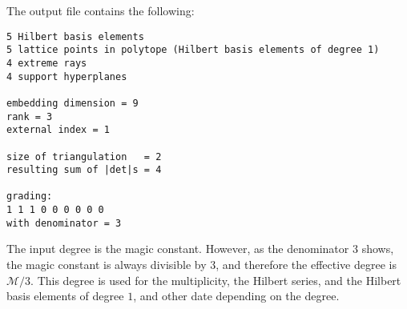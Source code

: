 \documentclass[12pt,a4paper]{scrartcl}
\theoremstyle{definition}
\begin{document}
The output file contains the following:

\begin{Verbatim}
5 Hilbert basis elements
5 lattice points in polytope (Hilbert basis elements of degree 1)
4 extreme rays
4 support hyperplanes

embedding dimension = 9
rank = 3
external index = 1

size of triangulation   = 2
resulting sum of |det|s = 4

grading:
1 1 1 0 0 0 0 0 0 
with denominator = 3
\end{Verbatim}
The input degree is the magic constant. However, as the
denominator $3$ shows, the magic constant is always divisible
by $3$, and therefore the effective degree is $\mathcal M/3$.
This degree is used for the multiplicity, the Hilbert series, and the 
Hilbert basis elements of degree $1$, and other date depending on the degree.
\end{document}
